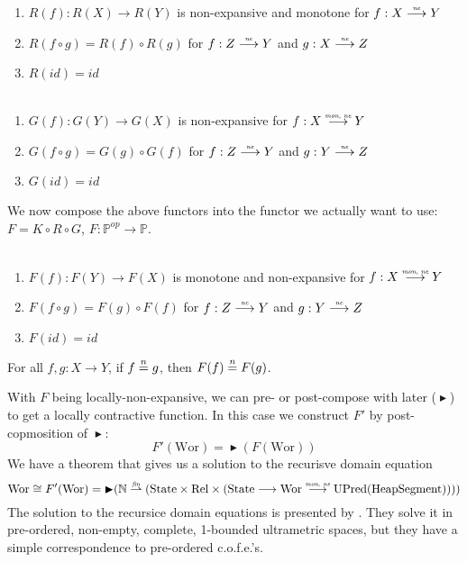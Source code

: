 \documentclass{article}
\newcommand{\forcenewline}{$\phantom{v}$\\}
\newcommand{\finparfun}{\stackrel{\textit{\tiny{fin}}}{\rightharpoonup}}
\newcommand{\monnefun}{\stackrel{\textit{\tiny{mon, ne}}}{\longrightarrow}}
\newcommand{\nefun}{\stackrel{\textit{\tiny{ne}}}{\longrightarrow}}
\newcommand{\fun}{\longrightarrow}
\newcommand{\nequal}[1][n]{\stackrel{\tiny{#1}}{=}}
\newcommand{\blater}{\mathop{\blacktriangleright}}
\newcommand{\id}{\var{id}}
\newcommand{\cofe}{c.o.f.e.}
\newcommand{\cofes}{\cofe{}'s}
\newcommand{\CatP}{\mathbb{P}}
\newcommand{\var}[1]{\mathit{#1}}
\newcommand{\plaindom}[1]{\mathrm{#1}}
\newcommand{\HeapSegments}{\plaindom{HeapSegment}}
\newcommand{\nats}{\mathbb{N}}
\newcommand{\Rel}{\plaindom{Rel}}
\newcommand{\States}{\plaindom{State}}
\newcommand{\Wor}{\plaindom{Wor}}
\newcommand{\UPred}[1]{\plaindom{UPred}(#1)}
\begin{document}
\begin{lemma}[$R$ functorial]\forcenewline
\label{lem:R-func}
  \begin{enumerate}
  \item $R(f) : R(X) \rightarrow R(Y)$ is non-expansive and monotone for $f : X \nefun Y$
  \item $R(f \circ g) = R(f) \circ R(g)$ for $f : Z \nefun Y$ and $g : X \nefun Z$
  \item $R(\id) = \id$
  \end{enumerate}
\end{lemma}

\begin{lemma}[$G$ functorial]\forcenewline
\label{lem:G-func}
  \begin{enumerate}
  \item $G(f) : G(Y) \rightarrow G(X)$ is non-expansive for $f : X \monnefun Y$
  \item $G(f \circ g) = G(g) \circ G(f)$ for $f : Z \nefun Y$ and $g : Y \nefun Z$
  \item $G(\id) = \id$
  \end{enumerate}
\end{lemma}
We now compose the above functors into the functor we actually want to use: $F = K \circ R \circ G$, $F : \CatP^{\var{op}} \rightarrow \CatP$.
\begin{lemma}[$F$ functorial]\forcenewline
\label{lem:F-func}
  \begin{enumerate}
  \item $F(f) : F(Y) \rightarrow F(X)$ is monotone and non-expansive for $f : X \monnefun Y$
  \item $F(f \circ g) = F(g) \circ F(f)$ for $f : Z \nefun Y$ and $g : Y \nefun Z$\
  \item $F(\id) = \id$
  \end{enumerate}
\end{lemma}

\begin{lemma}
\label{lem:F-loc-ne}
For all $f, g : X \fun Y$, if $f \nequal g$, then $F(f) \nequal F(g)$.
\end{lemma}
With $F$ being locally-non-expansive, we can pre- or post-compose with later ($\blater$) to get a locally contractive function. In this case we construct $F'$ by post-copmosition of $\blater$:
\[
  F'(\Wor) = \blater (F(\Wor))
\]
We have a theorem that gives us a solution to the recurisve domain equation
\[
  \Wor \cong F'(\Wor) = \blater (\nats \finparfun (\States \times \Rel \times (\States \fun \Wor \monnefun \UPred{\HeapSegments} )))
\]
The solution to the recursice domain equations is presented by \cite{Birkedal:2010:TCS:411:4102-4122}. They solve it in pre-ordered, non-empty, complete, 1-bounded ultrametric spaces, but they have a simple correspondence to pre-ordered \cofes{}.
\end{document}
